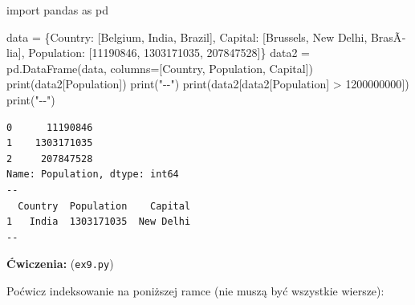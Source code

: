 \documentclass[
  polish,
  letterpaper,
  DIV=11,
  numbers=noendperiod]{scrreprt}
\newenvironment{Shaded}{\begin{snugshade}}{\end{snugshade}}
\newcommand{\BuiltInTok}[1]{\textcolor[rgb]{0.00,0.23,0.31}{#1}}
\newcommand{\DecValTok}[1]{\textcolor[rgb]{0.68,0.00,0.00}{#1}}
\newcommand{\ImportTok}[1]{\textcolor[rgb]{0.00,0.46,0.62}{#1}}
\newcommand{\NormalTok}[1]{\textcolor[rgb]{0.00,0.23,0.31}{#1}}
\newcommand{\OperatorTok}[1]{\textcolor[rgb]{0.37,0.37,0.37}{#1}}
\newcommand{\StringTok}[1]{\textcolor[rgb]{0.13,0.47,0.30}{#1}}
\begin{document}
\begin{Shaded}
\begin{Highlighting}[]
\ImportTok{import}\NormalTok{ pandas }\ImportTok{as}\NormalTok{ pd}

\NormalTok{data }\OperatorTok{=}\NormalTok{ \{}\StringTok{\textquotesingle{}Country\textquotesingle{}}\NormalTok{: [}\StringTok{\textquotesingle{}Belgium\textquotesingle{}}\NormalTok{, }\StringTok{\textquotesingle{}India\textquotesingle{}}\NormalTok{, }\StringTok{\textquotesingle{}Brazil\textquotesingle{}}\NormalTok{],}
        \StringTok{\textquotesingle{}Capital\textquotesingle{}}\NormalTok{: [}\StringTok{\textquotesingle{}Brussels\textquotesingle{}}\NormalTok{, }\StringTok{\textquotesingle{}New Delhi\textquotesingle{}}\NormalTok{, }\StringTok{\textquotesingle{}BrasÃ­lia\textquotesingle{}}\NormalTok{],}
        \StringTok{\textquotesingle{}Population\textquotesingle{}}\NormalTok{: [}\DecValTok{11190846}\NormalTok{, }\DecValTok{1303171035}\NormalTok{, }\DecValTok{207847528}\NormalTok{]\}}
\NormalTok{data2 }\OperatorTok{=}\NormalTok{ pd.DataFrame(data, columns}\OperatorTok{=}\NormalTok{[}\StringTok{\textquotesingle{}Country\textquotesingle{}}\NormalTok{, }\StringTok{\textquotesingle{}Population\textquotesingle{}}\NormalTok{, }\StringTok{\textquotesingle{}Capital\textquotesingle{}}\NormalTok{])}
\BuiltInTok{print}\NormalTok{(data2[}\StringTok{\textquotesingle{}Population\textquotesingle{}}\NormalTok{])}
\BuiltInTok{print}\NormalTok{(}\StringTok{"{-}{-}"}\NormalTok{)}
\BuiltInTok{print}\NormalTok{(data2[data2[}\StringTok{\textquotesingle{}Population\textquotesingle{}}\NormalTok{] }\OperatorTok{\textgreater{}} \DecValTok{1200000000}\NormalTok{])}
\BuiltInTok{print}\NormalTok{(}\StringTok{"{-}{-}"}\NormalTok{)}
\end{Highlighting}
\end{Shaded}

\begin{verbatim}
0      11190846
1    1303171035
2     207847528
Name: Population, dtype: int64
--
  Country  Population    Capital
1   India  1303171035  New Delhi
--
\end{verbatim}

\textbf{Ćwiczenia:} (\texttt{ex9.py})

Poćwicz indeksowanie na poniższej ramce (nie muszą być wszystkie
wiersze):
\end{document}
